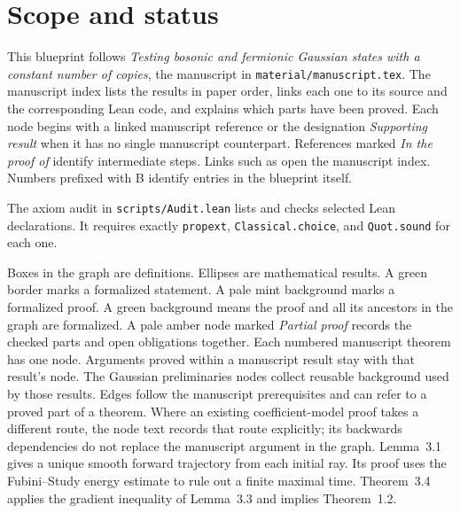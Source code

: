
\chapter{Scope and status}

This blueprint follows \emph{Testing bosonic and fermionic Gaussian states
with a constant number of copies}, the manuscript in
\texttt{material/manuscript.tex}. The manuscript index lists the results in
paper order, links each one to its source and the corresponding Lean code, and
explains which parts have been proved. Each node begins with a linked manuscript
reference or the designation \emph{Supporting result} when it has no single
manuscript counterpart. References marked \emph{In the proof of} identify
intermediate steps. Links such as  open the manuscript index. Numbers
prefixed with B identify entries in the blueprint itself.

The axiom audit in \texttt{scripts/Audit.lean} lists and checks selected Lean declarations.
It requires exactly \texttt{propext}, \texttt{Classical.choice}, and
\texttt{Quot.sound} for each one.

Boxes in the graph are definitions. Ellipses are mathematical results.
A green border marks a formalized statement. A pale mint background marks a formalized proof.
A green background means the proof and all its ancestors in the graph are formalized.
A pale amber node marked \emph{Partial proof} records the checked parts and
open obligations together. Each numbered manuscript theorem has one node.
Arguments proved within a manuscript result stay with that result's node.
The Gaussian preliminaries nodes collect reusable background used by those results.
Edges follow the manuscript prerequisites and can refer to a proved part of
a theorem. Where an existing coefficient-model proof takes a different route,
the node text records that route explicitly; its backwards dependencies do not
replace the manuscript argument in the graph. Lemma~3.1 gives a unique smooth forward trajectory from each
initial ray. Its proof uses the Fubini--Study energy estimate to rule out
a finite maximal time. Theorem~3.4 applies the gradient inequality of
Lemma~3.3 and implies Theorem~1.2.


